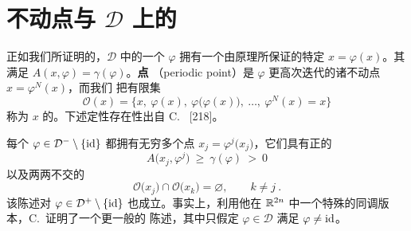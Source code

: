 
\section{不动点与 \texorpdfstring{$\mathcal{D}$}{D} 上的\trGeodesic}
\label{sec:fixed-points-geodesics}

%
%
%
%

正如我们所证明的，$\mathcal{D}$ 中的一个\trSymplecticDiffeomorphism{} $\varphi$%
拥有一个由\trMinimax{}原理所保证的特定\trFixedPoint{} $x=\varphi(x)$。其%
\trAction{}满足 $A(x,\varphi)=\gamma(\varphi)$。\textbf{\trPeriodic{}点}%
（periodic point）是 $\varphi$ 更高次迭代的诸不动点 $x=\varphi^{N}(x)$，而我们%
把有限集
\[
\mathcal{O}(x)=\bigl\{x,\ \varphi(x),\ \varphi\bigl(\varphi(x)\bigr),\ \ldots,\ %
\varphi^{N}(x)=x\bigr\}
\]
称为 $x$ 的\trOrbit。下述定性存在性\trhTheorem{}出自 C.~\trViterbo{} [218]。

\begin{theorem}\label{thm:viterbo-periodic-points}
每个 $\varphi\in\mathcal{D}^{-}\setminus\{\mathrm{id}\}$ 都拥有无穷多个\trPeriodic{}点%
$x_{j}=\varphi^{j}\bigl(x_{j}\bigr)$，它们具有正的\trAction
\[
A\bigl(x_{j},\varphi^{j}\bigr)\ \geq\ \gamma(\varphi)\ >\ 0
\]
以及两两不交的\trOrbit
\[
\mathcal{O}\bigl(x_{j}\bigr)\cap\mathcal{O}\bigl(x_{k}\bigr)=\varnothing,\qquad%
k\neq j\ .
\]
该陈述对 $\varphi\in\mathcal{D}^{+}\setminus\{\mathrm{id}\}$ 也成立。事实上，利用他在%
$\mathbb{R}^{2n}$ 中一个特殊\trCapacity{}的同调版本，C.~\trViterbo{}证明了一个更一般的%
陈述，其中只假定 $\varphi\in\mathcal{D}$ 满足 $\varphi\neq\mathrm{id}$。
\end{theorem}

